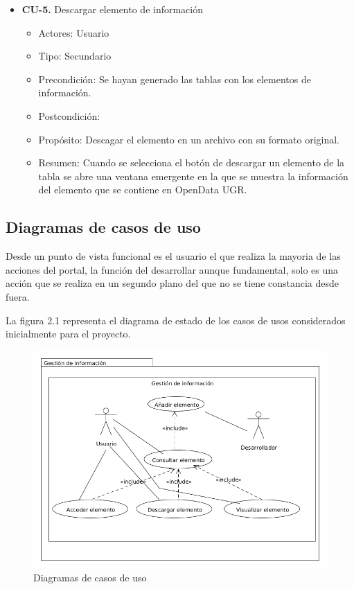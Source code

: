 \begin{itemize}
 \item \textbf{CU-5.} Descargar elemento de información
 \begin{itemize}
  \item Actores: Usuario
  \item Tipo: Secundario
  \item Precondición: Se hayan generado las tablas con los elementos de información.
  \item Postcondición: 
  \item Propósito: Descagar el elemento en un archivo con su formato original.
  \item Resumen: Cuando se selecciona el botón de descargar un elemento de la tabla se abre una ventana emergente en la que se
  muestra la información del elemento que se contiene en OpenData UGR.
 \end{itemize}
\end{itemize}

\subsection{Diagramas de casos de uso}

Desde un punto de vista funcional es el usuario el que realiza la mayoria de las acciones del portal, la función del 
desarrollar aunque fundamental, solo es una acción que se realiza en un segundo plano del que no se tiene constancia desde 
fuera.

\bigskip
La figura 2.1 representa el diagrama de estado de los casos de usos considerados inicialmente para el proyecto. 

\newpage
\begin{figure}[!h]
  \begin{center}
  \includegraphics[width=1\textwidth]{imagenes/diagrama_casos_uso.png}
  \end{center}
  \caption[Casos de uso]{Diagramas de casos de uso}
\end{figure}
